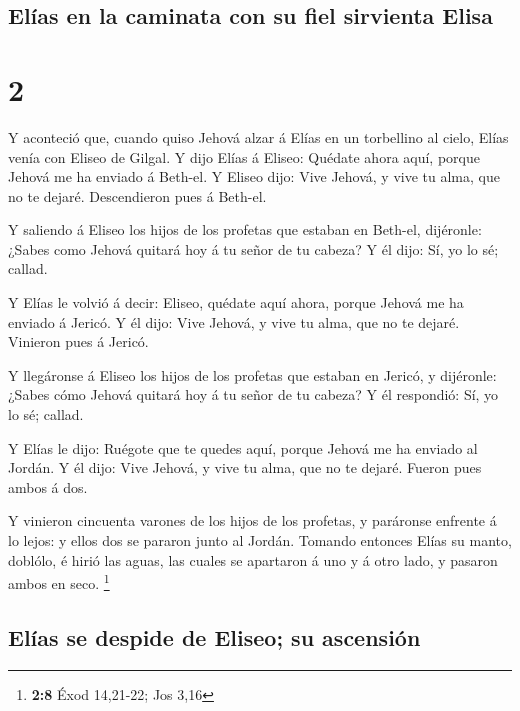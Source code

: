 \hypertarget{eluxedas-en-la-caminata-con-su-fiel-sirvienta-elisa}{%
\subsection{Elías en la caminata con su fiel sirvienta
Elisa}\label{eluxedas-en-la-caminata-con-su-fiel-sirvienta-elisa}}

\hypertarget{section-1}{%
\section{2}\label{section-1}}

 Y aconteció que, cuando quiso Jehová alzar á Elías en un
torbellino al cielo, Elías venía con Eliseo de Gilgal.  Y
dijo Elías á Eliseo: Quédate ahora aquí, porque Jehová me ha enviado á
Beth-el. Y Eliseo dijo: Vive Jehová, y vive tu alma, que no te dejaré.
Descendieron pues á Beth-el.

 Y saliendo á Eliseo los hijos de los profetas que estaban
en Beth-el, dijéronle: ¿Sabes como Jehová quitará hoy á tu señor de tu
cabeza? Y él dijo: Sí, yo lo sé; callad.

 Y Elías le volvió á decir: Eliseo, quédate aquí ahora,
porque Jehová me ha enviado á Jericó. Y él dijo: Vive Jehová, y vive tu
alma, que no te dejaré. Vinieron pues á Jericó.

 Y llegáronse á Eliseo los hijos de los profetas que
estaban en Jericó, y dijéronle: ¿Sabes cómo Jehová quitará hoy á tu
señor de tu cabeza? Y él respondió: Sí, yo lo sé; callad.

 Y Elías le dijo: Ruégote que te quedes aquí, porque
Jehová me ha enviado al Jordán. Y él dijo: Vive Jehová, y vive tu alma,
que no te dejaré. Fueron pues ambos á dos.

 Y vinieron cincuenta varones de los hijos de los
profetas, y paráronse enfrente á lo lejos: y ellos dos se pararon junto
al Jordán.  Tomando entonces Elías su manto, doblólo, é
hirió las aguas, las cuales se apartaron á uno y á otro lado, y pasaron
ambos en seco. \footnote{\textbf{2:8} Éxod 14,21-22; Jos 3,16}

\hypertarget{eluxedas-se-despide-de-eliseo-su-ascensiuxf3n}{%
\subsection{Elías se despide de Eliseo; su
ascensión}\label{eluxedas-se-despide-de-eliseo-su-ascensiuxf3n}}

